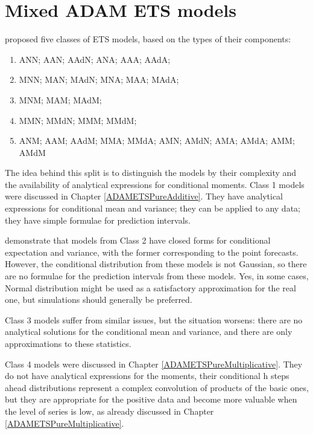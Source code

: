 \documentclass[
]{book}
\providecommand{\tightlist}{%
  \setlength{\itemsep}{0pt}\setlength{\parskip}{0pt}}
\theoremstyle{definition}
\theoremstyle{definition}
\theoremstyle{definition}
\theoremstyle{definition}
\theoremstyle{remark}
\begin{document}
\hypertarget{ADAMETSMixedModels}{%
\section{Mixed ADAM ETS models}\label{ADAMETSMixedModels}}

\citet{Hyndman2008b} proposed five classes of ETS models, based on the types of their components:

\begin{enumerate}
\def\labelenumi{\arabic{enumi}.}
\tightlist
\item
  ANN; AAN; AAdN; ANA; AAA; AAdA;
\item
  MNN; MAN; MAdN; MNA; MAA; MAdA;
\item
  MNM; MAM; MAdM;
\item
  MMN; MMdN; MMM; MMdM;
\item
  ANM; AAM; AAdM; MMA; MMdA; AMN; AMdN; AMA; AMdA; AMM; AMdM
\end{enumerate}

The idea behind this split is to distinguish the models by their complexity and the availability of analytical expressions for conditional moments. Class 1 models were discussed in Chapter \ref{ADAMETSPureAdditive}. They have analytical expressions for conditional mean and variance; they can be applied to any data; they have simple formulae for prediction intervals.

\citet{Hyndman2008b} demonstrate that models from Class 2 have closed forms for conditional expectation and variance, with the former corresponding to the point forecasts. However, the conditional distribution from these models is not Gaussian, so there are no formulae for the prediction intervals from these models. Yes, in some cases, Normal distribution might be used as a satisfactory approximation for the real one, but simulations should generally be preferred.

Class 3 models suffer from similar issues, but the situation worsens: there are no analytical solutions for the conditional mean and variance, and there are only approximations to these statistics.

Class 4 models were discussed in Chapter \ref{ADAMETSPureMultiplicative}. They do not have analytical expressions for the moments, their conditional h steps ahead distributions represent a complex convolution of products of the basic ones, but they are appropriate for the positive data and become more valuable when the level of series is low, as already discussed in Chapter \ref{ADAMETSPureMultiplicative}.
\end{document}
